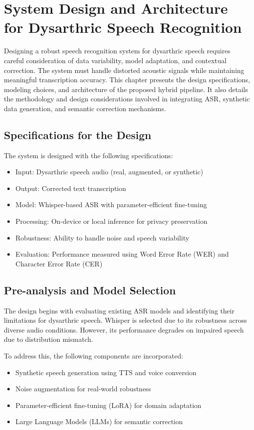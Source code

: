 \chapter{System Design and Architecture for Dysarthric Speech Recognition}

Designing a robust speech recognition system for dysarthric speech requires careful consideration of data variability, model adaptation, and contextual correction. The system must handle distorted acoustic signals while maintaining meaningful transcription accuracy. This chapter presents the design specifications, modeling choices, and architecture of the proposed hybrid pipeline. It also details the methodology and design considerations involved in integrating ASR, synthetic data generation, and semantic correction mechanisms.

\section{Specifications for the Design}

The system is designed with the following specifications:
\begin{itemize}
\item Input: Dysarthric speech audio (real, augmented, or synthetic)
\item Output: Corrected text transcription
\item Model: Whisper-based ASR with parameter-efficient fine-tuning
\item Processing: On-device or local inference for privacy preservation
\item Robustness: Ability to handle noise and speech variability
\item Evaluation: Performance measured using Word Error Rate (WER) and Character Error Rate (CER)
\end{itemize}

\section{Pre-analysis and Model Selection}

The design begins with evaluating existing ASR models and identifying their limitations for dysarthric speech. Whisper is selected due to its robustness across diverse audio conditions. However, its performance degrades on impaired speech due to distribution mismatch.

To address this, the following components are incorporated:
\begin{itemize}
\item Synthetic speech generation using TTS and voice conversion
\item Noise augmentation for real-world robustness
\item Parameter-efficient fine-tuning (LoRA) for domain adaptation
\item Large Language Models (LLMs) for semantic correction
\end{itemize}

